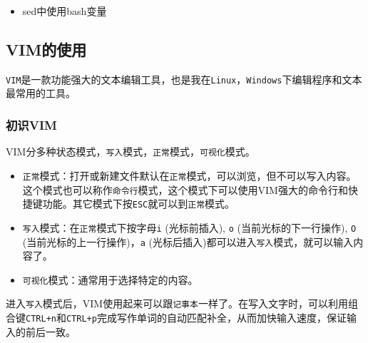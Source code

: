 \documentclass[]{article}
\newenvironment{Shaded}{\begin{snugshade}}{\end{snugshade}}
\newcommand{\CommentTok}[1]{\textcolor[rgb]{0.56,0.35,0.01}{\textit{#1}}}
\newcommand{\ExtensionTok}[1]{#1}
\newcommand{\FunctionTok}[1]{\textcolor[rgb]{0.00,0.00,0.00}{#1}}
\newcommand{\KeywordTok}[1]{\textcolor[rgb]{0.13,0.29,0.53}{\textbf{#1}}}
\newcommand{\NormalTok}[1]{#1}
\newcommand{\StringTok}[1]{\textcolor[rgb]{0.31,0.60,0.02}{#1}}
\newcommand{\VariableTok}[1]{\textcolor[rgb]{0.00,0.00,0.00}{#1}}
\providecommand{\tightlist}{%
  \setlength{\itemsep}{0pt}\setlength{\parskip}{0pt}}
\numberwithin{figure}{section}
\numberwithin{table}{section}
\begin{document}
\begin{itemize}
\tightlist
\item
  sed中使用bash变量
\end{itemize}

\begin{Shaded}
\end{Shaded}

\hypertarget{vim}{%
\subsection{VIM的使用}\label{vim}}

\texttt{VIM}是一款功能强大的文本编辑工具，也是我在\texttt{Linux}，\texttt{Windows}下编辑程序和文本最常用的工具。

\hypertarget{vim_first}{%
\subsubsection{初识VIM}\label{vim_first}}

VIM分多种状态模式，\texttt{写入}模式，\texttt{正常}模式，\texttt{可视化}模式。

\begin{itemize}
\tightlist
\item
  \texttt{正常}模式：打开或新建文件默认在\texttt{正常}模式，可以浏览，但不可以写入内容。这个模式也可以称作\texttt{命令行}模式，这个模式下可以使用VIM强大的命令行和快捷键功能。其它模式下按\texttt{ESC}就可以到\texttt{正常}模式。
\item
  \texttt{写入}模式：在\texttt{正常}模式下按字母\texttt{i} (光标前插入), \texttt{o} (当前光标的下一行操作), \texttt{O} (当前光标的上一行操作)，\texttt{a} (光标后插入)都可以进入\texttt{写入}模式，就可以输入内容了。
\item
  \texttt{可视化}模式：通常用于选择特定的内容。
\end{itemize}

进入\texttt{写入}模式后，VIM使用起来可以跟\texttt{记事本}一样了。在写入文字时，可以利用组合键\texttt{CTRL+n}和\texttt{CTRL+p}完成写作单词的自动匹配补全，从而加快输入速度，保证输入的前后一致。
\end{document}
